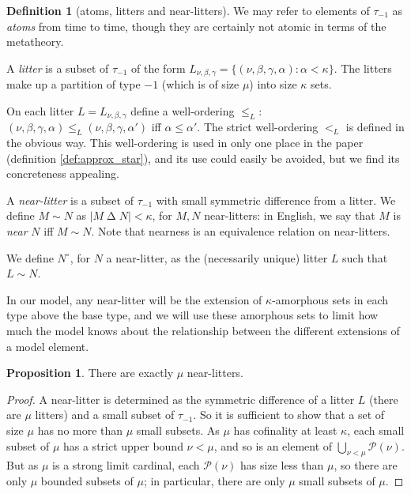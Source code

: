 \documentclass{article}
\theoremstyle{definition}
\newtheorem{proposition}[theorem]{Proposition}
\newtheorem{definition}[theorem]{Definition}
\theoremstyle{remark}
\begin{document}
{\begin{definition}[atoms, litters and near-litters]\label{def:atom_litter_near_litter}
We may refer to elements of $\tau_{-1}$ as {\em atoms\/} from time to time, though they are certainly not atomic in terms of the metatheory.

A {\em litter\/} is a subset of $\tau_{-1}$ of the form $L_{\nu,\beta,\gamma} = \{(\nu,\beta,\gamma,\alpha):\alpha<\kappa\}$.  The litters make up a partition of type $-1$
(which is of size $\mu$) into size $\kappa$ sets.

On each litter $L =  L_{\nu,\beta,\gamma}$ define a well-ordering $\leq_L$:  $(\nu,\beta,\gamma,\alpha) \leq_L (\nu,\beta,\gamma,\alpha')$  iff $\alpha\leq \alpha'$.
The strict well-ordering $<_L$ is defined in the obvious way.  This well-ordering is used in only one place in the paper (definition \ref{def:approx_star}), and its use could easily be avoided, but we find its concreteness appealing.

A {\em near-litter\/} is a subset of $\tau_{-1}$ with small symmetric difference from a litter.  We define $M \sim N$ as $|M \mathbin\Delta N|<\kappa$, for $M,N$ near-litters:  in English, we say that $M$ is {\em near\/} $N$ iff $M \sim N$.  Note that nearness is an equivalence relation on near-litters.

We define $N^\circ$, for $N$ a near-litter, as the (necessarily unique) litter $L$ such that $L \sim N$.
\end{definition}

In our model, any near-litter will be the extension of $\kappa$-amorphous sets in each type above the base type, and we will use these amorphous sets to limit how much the model knows about the relationship between the different extensions of a model element.

\begin{proposition}\label{def:count_near_litters}
There are exactly $\mu$ near-litters.

\end{proposition}

\begin{proof}
A near-litter is determined as the symmetric difference of a litter $L$ (there are $\mu$ litters) and a small subset of
$\tau_{-1}$.
So it is sufficient to show that a set of size $\mu$ has no more than $\mu$ small subsets.
As $\mu$ has cofinality at least $\kappa$, each small subset of $\mu$ has a strict upper bound $\nu<\mu$, and so is an element of $\bigcup_{\nu < \mu} \mathcal P(\nu)$.
But as $\mu$ is a strong limit cardinal, each $\mathcal P(\nu)$ has size less than $\mu$, so there are only $\mu$ bounded subsets of $\mu$; in particular, there are only $\mu$ small subsets of $\mu$.
\end{proof}

}
\end{document}

